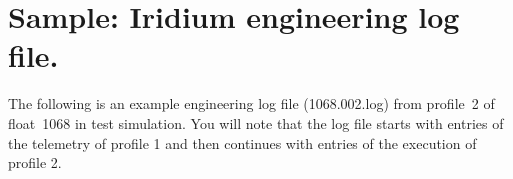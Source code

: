 %
%
%
%
%
%

\setlength{\oddsidemargin}{0.in}
\setlength{\evensidemargin}{0in}
\setlength{\leftmargin}{0in}

\section{Sample: Iridium engineering log file.}
\label{sec:IridiumLogSample}
\renewcommand{\theequation}{\Alph{section}.\arabic{equation}}

The following is an example engineering log file (1068.002.log) from
profile~2 of float~1068 in test simulation.  You will note that the log file starts
with entries of the telemetry of profile 1 and then continues with entries
of the execution of profile 2. 

